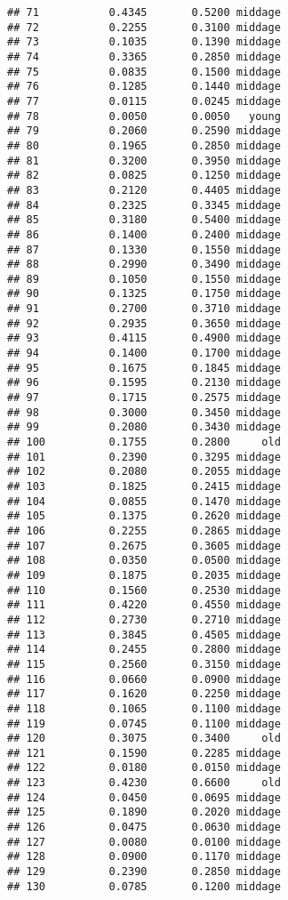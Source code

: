 \documentclass[
]{article}
\begin{document}
\begin{verbatim}
## 71           0.4345       0.5200 middage
## 72           0.2255       0.3100 middage
## 73           0.1035       0.1390 middage
## 74           0.3365       0.2850 middage
## 75           0.0835       0.1500 middage
## 76           0.1285       0.1440 middage
## 77           0.0115       0.0245 middage
## 78           0.0050       0.0050   young
## 79           0.2060       0.2590 middage
## 80           0.1965       0.2850 middage
## 81           0.3200       0.3950 middage
## 82           0.0825       0.1250 middage
## 83           0.2120       0.4405 middage
## 84           0.2325       0.3345 middage
## 85           0.3180       0.5400 middage
## 86           0.1400       0.2400 middage
## 87           0.1330       0.1550 middage
## 88           0.2990       0.3490 middage
## 89           0.1050       0.1550 middage
## 90           0.1325       0.1750 middage
## 91           0.2700       0.3710 middage
## 92           0.2935       0.3650 middage
## 93           0.4115       0.4900 middage
## 94           0.1400       0.1700 middage
## 95           0.1675       0.1845 middage
## 96           0.1595       0.2130 middage
## 97           0.1715       0.2575 middage
## 98           0.3000       0.3450 middage
## 99           0.2080       0.3430 middage
## 100          0.1755       0.2800     old
## 101          0.2390       0.3295 middage
## 102          0.2080       0.2055 middage
## 103          0.1825       0.2415 middage
## 104          0.0855       0.1470 middage
## 105          0.1375       0.2620 middage
## 106          0.2255       0.2865 middage
## 107          0.2675       0.3605 middage
## 108          0.0350       0.0500 middage
## 109          0.1875       0.2035 middage
## 110          0.1560       0.2530 middage
## 111          0.4220       0.4550 middage
## 112          0.2730       0.2710 middage
## 113          0.3845       0.4505 middage
## 114          0.2455       0.2800 middage
## 115          0.2560       0.3150 middage
## 116          0.0660       0.0900 middage
## 117          0.1620       0.2250 middage
## 118          0.1065       0.1100 middage
## 119          0.0745       0.1100 middage
## 120          0.3075       0.3400     old
## 121          0.1590       0.2285 middage
## 122          0.0180       0.0150 middage
## 123          0.4230       0.6600     old
## 124          0.0450       0.0695 middage
## 125          0.1890       0.2020 middage
## 126          0.0475       0.0630 middage
## 127          0.0080       0.0100 middage
## 128          0.0900       0.1170 middage
## 129          0.2390       0.2850 middage
## 130          0.0785       0.1200 middage

\end{verbatim}
\end{document}
